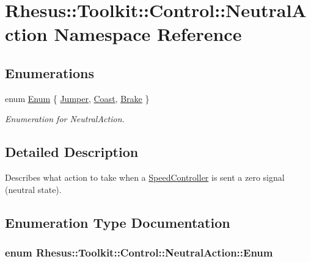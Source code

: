 \hypertarget{namespace_rhesus_1_1_toolkit_1_1_control_1_1_neutral_action}{\section{Rhesus\-:\-:Toolkit\-:\-:Control\-:\-:Neutral\-Action Namespace Reference}
\label{namespace_rhesus_1_1_toolkit_1_1_control_1_1_neutral_action}
}
\subsection*{Enumerations}
\begin{DoxyCompactItemize}
\item 
enum \hyperlink{namespace_rhesus_1_1_toolkit_1_1_control_1_1_neutral_action_a363f4138321e0d173057fa515de9e06b}{Enum} \{ \hyperlink{namespace_rhesus_1_1_toolkit_1_1_control_1_1_neutral_action_a363f4138321e0d173057fa515de9e06ba475e59cba554e962377defd2a8f446fc}{Jumper}, 
\hyperlink{namespace_rhesus_1_1_toolkit_1_1_control_1_1_neutral_action_a363f4138321e0d173057fa515de9e06ba58644a63da94285da6ab2fc82a32dbca}{Coast}, 
\hyperlink{namespace_rhesus_1_1_toolkit_1_1_control_1_1_neutral_action_a363f4138321e0d173057fa515de9e06baebf034c922a605ca883d02ef7a33d7d2}{Brake}
 \}
\begin{DoxyCompactList}\small\item\em Enumeration for Neutral\-Action. \end{DoxyCompactList}\end{DoxyCompactItemize}


\subsection{Detailed Description}
Describes what action to take when a \hyperlink{class_rhesus_1_1_toolkit_1_1_control_1_1_speed_controller}{Speed\-Controller} is sent a zero signal (neutral state). 

\subsection{Enumeration Type Documentation}
\hypertarget{namespace_rhesus_1_1_toolkit_1_1_control_1_1_neutral_action_a363f4138321e0d173057fa515de9e06b}{
\subsubsection[{Enum}]{\setlength{\rightskip}{0pt plus 5cm}enum {\bf Rhesus\-::\-Toolkit\-::\-Control\-::\-Neutral\-Action\-::\-Enum}}}\label{namespace_rhesus_1_1_toolkit_1_1_control_1_1_neutral_action_a363f4138321e0d173057fa515de9e06b}


